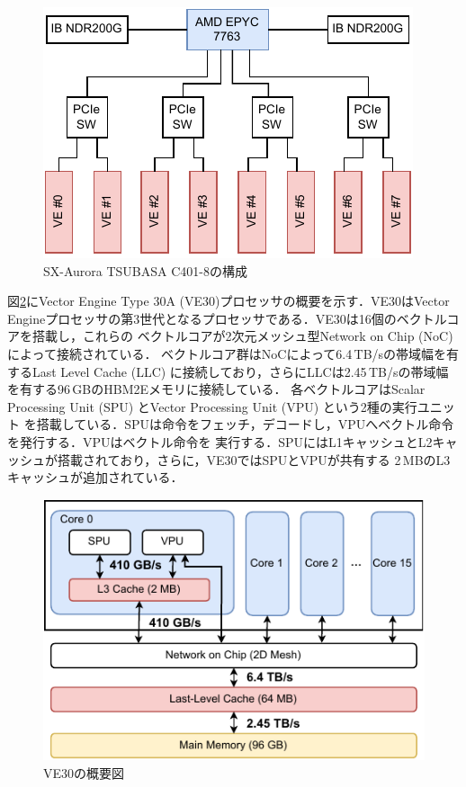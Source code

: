 ﻿\documentclass[submit,techrep,noauthor]{ipsj}
\begin{document}
\begin{figure}
  \centering
  \includegraphics{figs/node_arch.pdf}
  \caption{SX-Aurora TSUBASA C401-8の構成}\label{fig:node}
\end{figure}

図\ref{fig:ve30}にVector Engine Type 30A (VE30)プロセッサの概要を示す．VE30はVector
Engineプロセッサの第3世代となるプロセッサである．VE30は16個のベクトルコアを搭載し，これらの
ベクトルコアが2次元メッシュ型Network on Chip (NoC)によって接続されている．
ベクトルコア群はNoCによって6.4\,TB/sの帯域幅を有するLast Level Cache 
(LLC) に接続しており，さらにLLCは2.45\,TB/sの帯域幅を有する96\,GBのHBM2Eメモリに接続している．
各ベクトルコアはScalar Processing Unit (SPU) とVector Processing Unit (VPU) という2種の実行ユニット
を搭載している．SPUは命令をフェッチ，デコードし，VPUへベクトル命令を発行する．VPUはベクトル命令を
実行する．SPUにはL1キャッシュとL2キャッシュが搭載されており，さらに，VE30ではSPUとVPUが共有する
2\,MBのL3キャッシュが追加されている．

\begin{figure}
  \centering
  \includegraphics{figs/ve30_memory_hierarchy.pdf}
  \caption{VE30の概要図~\cite{Takahashi2023}}\label{fig:ve30}
\end{figure}
\end{document}
